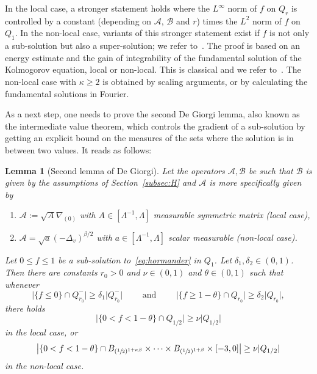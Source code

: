 \documentclass[10pt]{amsart}
\newenvironment{enumeratei}
{\bgroup\def\theenumi{\roman{enumi}}\def\theenumii{\arabic{enumii}}\begin{enumerate}}
{\end{enumerate}\egroup}
\newtheorem{lemma}[theorem]{Lemma}
\theoremstyle{definition}
\newcommand{\cA}{{\mathcal A}}
\newcommand{\cB}{{\mathcal B}}
\begin{document}
In the local case, a stronger statement holds where the
$L^\infty$ norm of $f$ on $Q_r$ is controlled by a constant
(depending on $\cA$, $\cB$ and $r$) times the $L^2$ norm of $f$
on $Q_1$. In the non-local case, variants of this stronger
statement exist if $f$ is not only a sub-solution but also a
super-solution; we refer to~\cite{Loher-2023, Loher-2024}. The proof is based
on an energy estimate and the gain of integrability of the
fundamental solution of the Kolmogorov equation, local or
non-local. This is classical and we refer
to~\cite{guerand-mouhot,loher-2022-preprint-quantitative-de-giorgi,AR-harnack, PP, IS-weak, APP}. The
non-local case with $\kappa \geq 2$ is obtained
by scaling arguments, or by calculating the fundamental
solutions in Fourier.

As a next step, one needs to prove the second De Giorgi lemma, also known as the intermediate value theorem, which controls the gradient of a sub-solution by getting an explicit bound on the measures of the sets where the solution is in between two values.
It reads as follows:
\begin{lemma}[Second lemma of De Giorgi]
Let the operators $\cA, \cB$ be such that $\cB$ is given by
the assumptions of Section~\ref{subsec:H} and $\cA$ is more specifically given by
\begin{enumeratei}
\item
$\cA:=\sqrt{A} \nabla_{(0)}$ with
$A \in [\Lambda^{-1},\Lambda]$ measurable symmetric matrix (local
case),
\item
$\cA = \sqrt{a} (-\Delta_v)^{\beta/2}$ with
$a \in [\Lambda^{-1},\Lambda]$ scalar measurable (non-local
case).
\end{enumeratei}
Let $0 \leq f \leq 1$ be a sub-solution to~\eqref{eq:hormander} in $Q_1$. Let $\delta_1, \delta_2 \in (0, 1)$. Then there are
constants $r_0 > 0$ and $\nu \in (0, 1)$ and
$\theta \in (0, 1)$ such that whenever
\begin{equation*}
\label{eq:conditions-ivl}
\vert \{f \leq 0\} \cap Q_{r_0}^-\vert \geq \delta_1 \vert
Q_{r_0}^-\vert \qquad \textrm{ and } \qquad \vert \{f \geq
1-\theta\} \cap Q_{r_0}\vert \geq \delta_2 \vert Q_{r_0}\vert,
\end{equation*}
there holds
\begin{equation*}
\big\vert \{0 < f < 1-\theta\} \cap Q_{1/2}\big\vert \geq \nu
\vert Q_{1/2}\vert
\end{equation*}
in the local case, or
\begin{equation*}
\big\vert \{0 < f < 1-\theta\} \cap
B_{(\sfrac12)^{1+\kappa\beta}} \times \cdots \times
B_{(\sfrac12)^{1+\beta}} \times [-3,0] \big\vert \geq \nu
\vert Q_{1/2}\vert
\end{equation*}
in the non-local case.
\end{lemma}
\end{document}
